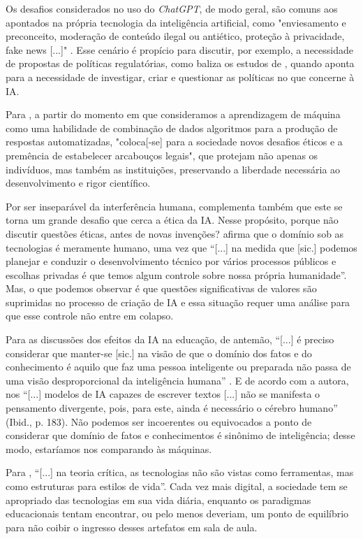 \documentclass[portuguese]{textolivre}
\begin{document}
Os desafios considerados no uso do \emph{ChatGPT}, de modo geral, são comuns aos apontados na própria tecnologia da inteligência artificial, como "enviesamento e preconceito, moderação de conteúdo ilegal ou antiético, proteção à privacidade, fake news [...]" \cite[p. 191]{2022kaufman}. Esse cenário é propício para discutir, por exemplo, a necessidade de propostas de políticas regulatórias, como baliza os estudos de \textcite{coeckelbergh2020ai}, quando aponta para a necessidade de investigar, criar e questionar as políticas no que concerne à IA.

Para \textcite[p. 83]{2022kaufman}, a partir do momento em que consideramos a aprendizagem de máquina como uma habilidade de combinação de dados algoritmos para a produção de respostas automatizadas, "coloca[-se] para a sociedade novos desafios éticos e a premência de estabelecer arcabouços legais", que protejam não apenas os indivíduos, mas também as instituições, preservando a liberdade necessária ao desenvolvimento e rigor científico.

Por ser inseparável da interferência humana, \textcite{santaella2023inteligencia} complementa também que este se torna um grande desafio que cerca a ética da IA. Nesse propósito, porque não discutir questões éticas, antes de novas invenções? \textcite[p. 2]{feenberg2004} afirma que o domínio sob as tecnologias é meramente humano, uma vez que “[...] na medida que [sic.] podemos planejar e conduzir o desenvolvimento técnico por vários processos públicos e escolhas privadas é que temos algum controle sobre nossa própria humanidade”. Mas, o que podemos observar é que questões significativas de valores são suprimidas no processo de criação de IA e essa situação requer uma análise para que esse controle não entre em colapso. 

Para as discussões dos efeitos da IA na educação, de antemão, “[...] é preciso considerar que manter-se [sic.] na visão de que o domínio dos fatos e do conhecimento é aquilo que faz uma pessoa inteligente ou preparada não passa de uma visão desproporcional da inteligência humana” \cite[p. 183]{santaella2023inteligencia}. E de acordo com a autora, nos “[...] modelos de IA capazes de escrever textos [...] não se manifesta o pensamento divergente, pois, para este, ainda é necessário o cérebro humano” (Ibid., p. 183). Não podemos ser incoerentes ou equivocados a ponto de considerar que domínio de fatos e conhecimentos é sinônimo de inteligência; desse modo, estaríamos nos comparando às máquinas.

Para \textcite[p. 10]{feenberg2003}, “[...] na teoria crítica, as tecnologias não são vistas como ferramentas, mas como estruturas para estilos de vida”. Cada vez mais digital, a sociedade tem se apropriado das tecnologias em sua vida diária, enquanto os paradigmas educacionais tentam encontrar, ou pelo menos deveriam, um ponto de equilíbrio para não coibir o ingresso desses artefatos em sala de aula.
\end{document}
